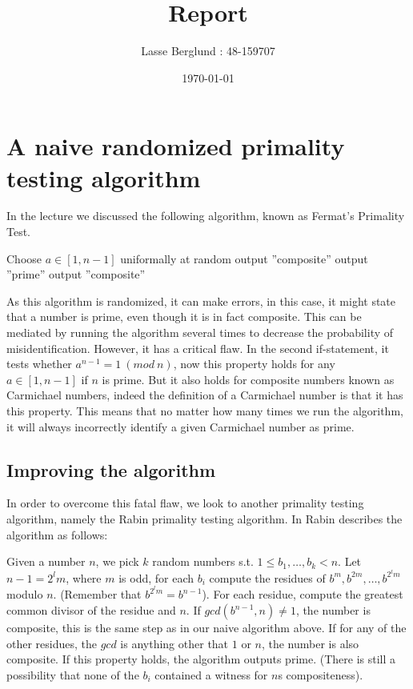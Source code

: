 \documentclass[12pt]{report}
\title{Report}
\author{Lasse Berglund : 48-159707}
\date{\today}
\begin{document}
\maketitle

\section*{A naive randomized primality testing algorithm}

In the lecture we discussed the following algorithm, known as Fermat's Primality Test.


\begin{algorithmic}
    \State Choose $a \in [1,n-1]$ uniformally at random
      \State output ''composite''
    \Else
        \State output ''prime''
      \Else
        \State output ''composite''
      \EndIf
    \EndIf
  \EndFunction
\end{algorithmic}

As this algorithm is randomized, it can make errors, in this case, it might state that a number is prime, even though it is in fact composite. This can be mediated by running the algorithm several times to decrease the probability of misidentification. However, it has a critical flaw. In the second if-statement, it tests whether $a^{n-1} = 1 \ (mod \ n)$, now this property holds for any $a \in [1,n-1]$ if $n$ is prime. But it also holds for composite numbers known as Carmichael numbers, indeed the definition of a Carmichael number is that it has this property. This means that no matter how many times we run the algorithm, it will always incorrectly identify a given Carmichael number as prime.

\subsection*{Improving the algorithm}

In order to overcome this fatal flaw, we look to another primality testing algorithm, namely the Rabin primality testing algorithm. In \cite{RABIN} Rabin describes the algorithm as follows:

Given a number $n$, we pick $k$ random numbers s.t. $1 \le b_1,\ldots,b_k < n$. Let $n - 1 = 2^lm$, where $m$ is odd, for each $b_i$ compute the residues of $b^m, b^{2m}, \ldots, b^{2^lm}$ modulo $n$. (Remember that $b^{2^lm} = b^{n-1}$). For each residue, compute the greatest common divisor of the residue and $n$. If $gcd(b^{n-1},n) \neq 1$, the number is composite, this is the same step as in our naive algorithm above. If for any of the other residues, the $gcd$ is anything other that $1$ or $n$, the number is also composite. If this property holds, the algorithm outputs prime. (There is still a possibility that none of the $b_i$ contained a witness for $n$s compositeness). 
\end{document}
